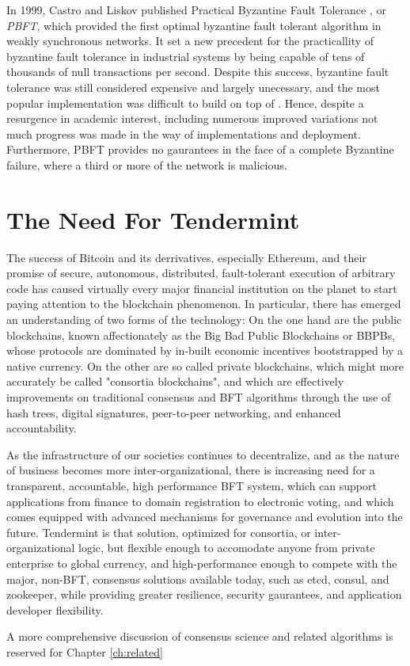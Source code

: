 In 1999, Castro and Liskov published Practical Byzantine Fault Tolerance \cite{pbft}, or \emph{PBFT}, 
which provided the first optimal byzantine fault tolerant algorithm in weakly synchronous networks.
It set a new precedent for the practicallity of byzantine fault tolerance in industrial systems by being capable of 
tens of thousands of null transactions per second.
Despite this success, byzantine fault tolerance was still considered expensive and largely unecessary, 
and the most popular implementation was difficult to build on top of \cite{ppbft}.
Hence, despite a resurgence in academic interest, including numerous improved variations \cite{yin2003separating, kotla2007zyzzyva}
not much progress was made in the way of implementations and deployment.
Furthermore, PBFT provides no gaurantees in the face of a complete Byzantine failure, where a third or more of the network is malicious.

\section{The Need For Tendermint}

The success of Bitcoin and its derrivatives, especially Ethereum, and their promise of secure, autonomous, distributed, fault-tolerant execution of arbitrary code has caused virtually every major financial institution on the planet to start paying attention to the blockchain phenomenon. 
In particular, there has emerged an understanding of two forms of the technology:
On the one hand are the public blockchains, known affectionately as the Big Bad Public Blockchains or BBPBs, 
whose protocols are dominated by in-built economic incentives bootstrapped by a native currency.
On the other are so called private blockchains, which might more accurately be called "consortia blockchains",
and which are effectively improvements on traditional consensus and BFT algorithms through the use of hash trees, digital signatures, 
peer-to-peer networking, and enhanced accountability.

As the infrastructure of our societies continues to decentralize, and as the nature of business becomes more inter-organizational,
there is increasing need for a transparent, accountable, high performance BFT system, which can support applications from finance to domain registration to electronic voting,
and which comes equipped with advanced mechanisms for governance and evolution into the future.
Tendermint is that solution, optimized for consortia, or inter-organizational logic, but flexible enough to accomodate anyone from private enterprise to global currency,
and high-performance enough to compete with the major, non-BFT, consensus solutions available today, such as etcd, consul, and zookeeper, while providing greater resilience, security gaurantees, and application developer flexibility.

A more comprehensive discussion of consensus science and related algorithms is reserved for Chapter \ref{ch:related}

